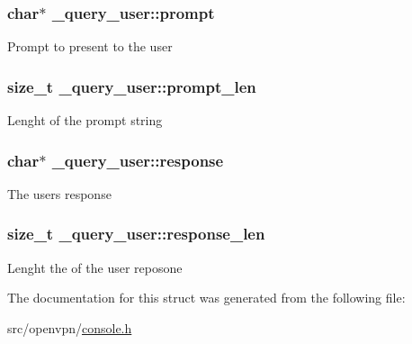 \subsubsection[{prompt}]{\setlength{\rightskip}{0pt plus 5cm}char$\ast$ \+\_\+query\+\_\+user\+::prompt}\label{struct__query__user_a0d31c4f55f2bf9b3ea982a448492cc9b}
Prompt to present to the user \hypertarget{struct__query__user_a256a230796e573740fa100702526f123}{}
\subsubsection[{prompt\+\_\+len}]{\setlength{\rightskip}{0pt plus 5cm}size\+\_\+t \+\_\+query\+\_\+user\+::prompt\+\_\+len}\label{struct__query__user_a256a230796e573740fa100702526f123}
Lenght of the prompt string \hypertarget{struct__query__user_adcb311b865e572b4f1fd10a9e33cd753}{}
\subsubsection[{response}]{\setlength{\rightskip}{0pt plus 5cm}char$\ast$ \+\_\+query\+\_\+user\+::response}\label{struct__query__user_adcb311b865e572b4f1fd10a9e33cd753}
The user\textquotesingle{}s response \hypertarget{struct__query__user_ab25afbb0907d98746eb46438accb7afb}{}
\subsubsection[{response\+\_\+len}]{\setlength{\rightskip}{0pt plus 5cm}size\+\_\+t \+\_\+query\+\_\+user\+::response\+\_\+len}\label{struct__query__user_ab25afbb0907d98746eb46438accb7afb}
Lenght the of the user reposone 

The documentation for this struct was generated from the following file\+:\begin{DoxyCompactItemize}
\item 
src/openvpn/\hyperlink{console_8h}{console.\+h}\end{DoxyCompactItemize}
